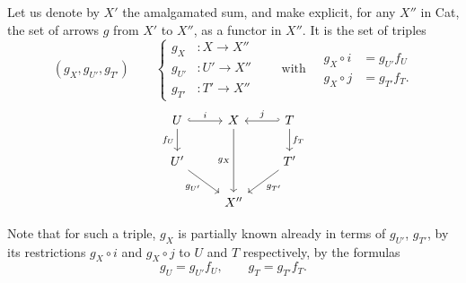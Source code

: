 Let us denote by $X'$ the amalgamated sum, and make explicit, for any $X''$ in Cat, the set of arrows $g$ from $X'$ to $X''$, as a functor in $X''$. It is the set of triples
\[
(g_X, g_{U'}, g_{T'}) \qquad
\left\{\begin{aligned} g_X &: X \longrightarrow X'' \\ g_{U'} &: U' \longrightarrow X'' \\ g_{T'} &: T' \longrightarrow X''\end{aligned}\right.
\qquad \text{with} \quad
\begin{aligned} g_X\circ i &= g_{U'} f_U \\ g_X \circ j &= g_{T'} f_T. \end{aligned}
\tag*{$(*)$}
\]
\[
\begin{tikzcd}
U \arrow[r, hook, "i"] \arrow[d, "f_U"'] & X \arrow[dd, "g_X"'] & T \arrow[l, hook', "j"'] \arrow[d, "f_T"] \\
U' \arrow[dr, "g_{U'}"'] & & T' \arrow[dl, "g_{T'}"] \\
& X'' &
\end{tikzcd}
\]

Note that for such a triple, $g_X$ is partially known already in terms of $g_{U'}$, $g_{T'}$, by its restrictions $g_X\circ i$ and $g_X\circ j$ to $U$ and $T$ respectively, by the formulas
\[
g_U = g_{U'}f_U, \qquad g_T = g_{T'}f_T.
\]

